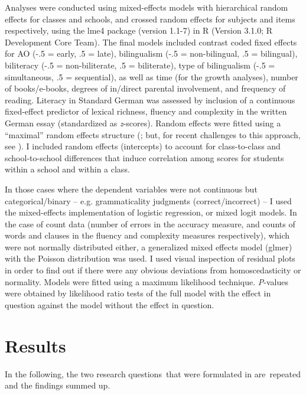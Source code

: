 \documentclass[output=paper,modfonts,nonflat,newtxmath]{langsci/langscibook}
\begin{document}
Analyses were conducted using mixed-effects models with hierarchical random effects for classes and schools, and crossed random effects for subjects and items respectively, using the lme4 package (version 1.1-7) in R (Version 3.1.0; R Development Core Team). The final models included contrast coded fixed effects for AO (-.5 = early, .5 = late), bilingualism (-.5 = non-bilingual, .5 = bilingual), biliteracy (-.5 = non-biliterate, .5 = biliterate), type of bilingualism (-.5 = simultaneous, .5 = sequential), as well as time (for the growth analyses), number of books/e-books, degrees of in/direct parental involvement, and frequency of reading. Literacy in Standard German was assessed by inclusion of a continuous fixed-effect predictor of lexical richness, fluency and complexity in the written German essay (standardized as \textit{z}{}-scores). Random effects were fitted using a “maximal” random effects structure (\citealt{BarrEtAl2013}; but, for recent challenges to this approach, see \citealt{BatesEtAl2015}). I included random effects (intercepts) to account for class-to-class and school-to-school differences that induce correlation among scores for students within a school and within a class.

In those cases where the dependent variables were not continuous but categorical/binary – e.g. grammaticality judgments (correct/incorrect) – I used the mixed-effects implementation of logistic regression, or mixed logit models. In the case of count data (number of errors in the accuracy measure, and counts of words and clauses in the fluency and complexity measures respectively), which were not normally distributed either, a generalized mixed effects model (glmer) with the Poisson distribution was used. I used visual inspection of residual plots in order to find out if there were any obvious deviations from homoscedasticity or normality. Models were fitted using a maximum likelihood technique. \textit{P}{}-values were obtained by likelihood ratio tests of the full model with the effect in question against the model without the effect in question.\\

\section{Results}
\label{sec:pfenninger:4}

In the following, the two research questions~that were formulated in  are~repeated and the findings summed up.
\end{document}
